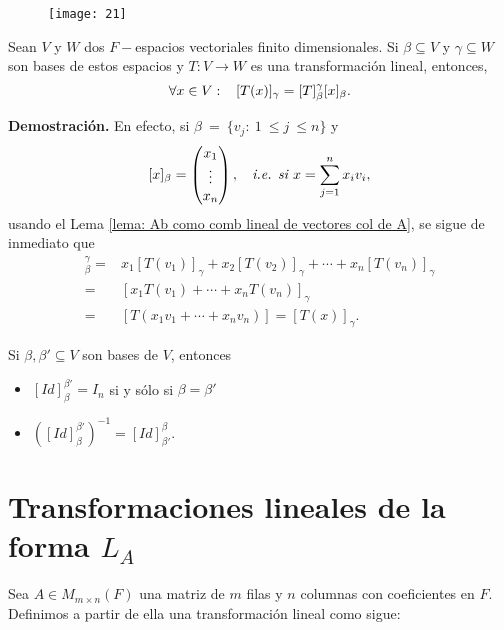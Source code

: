\begin{figure}[H]
\centering\captionsetup{format = hang}
		\texttt{[image: 21]}
 \end{figure}
\QEDB 
\vspace{0.2cm}

\begin{teo}
	\label{teo: calculando Tx en terminos de representaciones matriciales}
Sean $V$ y $W$ dos $F-$espacios vectoriales finito dimensionales.
Si $\beta \subseteq V$ y $\gamma \subseteq W$ son bases de estos espacios
y $T: V \longrightarrow W$ es una transformación lineal, 
entonces, 
\[
\forall x \in V: \hspace{0.3cm} 
[T(x)]_{\gamma} = [T]_{\beta}^{\gamma} [x]_{\beta}.
\]
\end{teo}
\noindent
\textbf{Demostración.}
En efecto, 
si $\beta \ =\ \{v_{j} :\ 1\ \leq j\ \leq n \}$ y
\[
[x]_{\beta} = \begin{pmatrix}
x_{1} \\
\vdots \\
x_{n}
\end{pmatrix},
\hspace{0.2cm} \textit{ i.e. si }
x = \sum_{j=1}^{n} x_{i}v_{i},
\]
usando el Lema \ref{lema: Ab como comb lineal de vectores col de A},
se sigue de inmediato que 
\begin{align*}
[T]_{\beta}^{\gamma} = & 
x_{1} [T(v_{1})]_{\gamma} + x_{2} [T(v_{2})]_{\gamma} + \cdots + 
x_{n}[T(v_{n})]_{\gamma} \\
= & [x_{1}T(v_{1}) + \cdots + 
x_{n} T(v_{n})]_{\gamma} \\
= & [T(x_{1}v_{1} + \cdots + x_{n}v_{n})] = [T(x)]_{\gamma}.
\end{align*}

\QEDB
\vspace{0.2cm}

\begin{prop}
Si $\beta, \beta' \subseteq V$ son bases de $V$, entonces 
\begin{itemize}
	\item $[Id]_{\beta}^{\beta'} = I_{n}$ si y sólo si $\beta = \beta'$
	\item $([Id]_{\beta}^{\beta'})^{-1} = [Id]_{\beta'}^{\beta}$.
\end{itemize}
\end{prop}

\section{Transformaciones lineales de la forma $L_{A}$}
Sea $A \in M_{m \times n} (F)$ una matriz de $m$ filas y 
$n$ columnas con coeficientes en $F$. Definimos a partir de ella
una transformación lineal como sigue:

